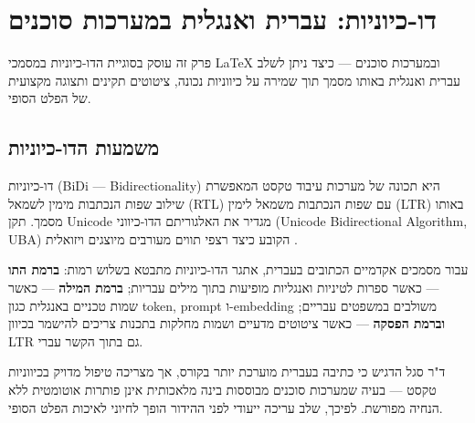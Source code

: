 
\hebrewheadingformat
\chapter{\texthebrew{דו-כיוניות: עברית ואנגלית במערכות סוכנים}}
\label{ch:bidi}

\begin{hebrew}
פרק זה עוסק בסוגיית הדו-כיוניות במסמכי \foreignlanguage{english}{LaTeX}
ובמערכות סוכנים --- כיצד ניתן לשלב עברית ואנגלית באותו מסמך תוך שמירה
על כיווניות נכונה, ציטוטים תקינים ותצוגה מקצועית של הפלט הסופי.
\end{hebrew}

\section[\texthebrew{משמעות הדו-כיוניות}]{\texthebrew{משמעות הדו-כיוניות}\mbox{\setLTR\enspace\thesection}}
\label{sec:bidi-meaning}

\begin{hebrew}
דו-כיוניות (\foreignlanguage{english}{BiDi} --- \foreignlanguage{english}{Bidirectionality})
היא תכונה של מערכות עיבוד טקסט המאפשרת שילוב שפות הנכתבות מימין לשמאל
(\foreignlanguage{english}{RTL}) עם שפות הנכתבות משמאל לימין
(\foreignlanguage{english}{LTR}) באותו מסמך.
תקן \foreignlanguage{english}{Unicode} מגדיר את האלגוריתם הדו-כיווני
(\foreignlanguage{english}{Unicode Bidirectional Algorithm},
\foreignlanguage{english}{UBA}) הקובע כיצד רצפי תווים מעורבים
מיוצגים ויזואלית \foreignlanguage{english}{\cite{Unicode2023}}.

עבור מסמכים אקדמיים הכתובים בעברית, אתגר הדו-כיוניות מתבטא בשלוש רמות:
\textbf{ברמת התו} --- כאשר ספרות לטיניות ואנגליות מופיעות בתוך מילים עבריות;
\textbf{ברמת המילה} --- כאשר שמות טכניים באנגלית כגון
\foreignlanguage{english}{token}, \foreignlanguage{english}{prompt}
ו-\foreignlanguage{english}{embedding} משולבים במשפטים עבריים;
\textbf{וברמת הפסקה} --- כאשר ציטוטים מדעיים ושמות מחלקות בתכנות
צריכים להישמר בכיוון \foreignlanguage{english}{LTR} גם בתוך הקשר עברי.

ד"ר סגל הדגיש \foreignlanguage{english}{\cite{Segal2026}}
כי כתיבה בעברית מוערכת יותר בקורס,
אך מצריכה טיפול מדויק בכיווניות טקסט ---
בעיה שמערכות סוכנים מבוססות בינה מלאכותית
אינן פותרות אוטומטית ללא הנחיה מפורשת.
לפיכך, שלב עריכה ייעודי לפני ההידור הופך לחיוני לאיכות הפלט הסופי.
\end{hebrew}

